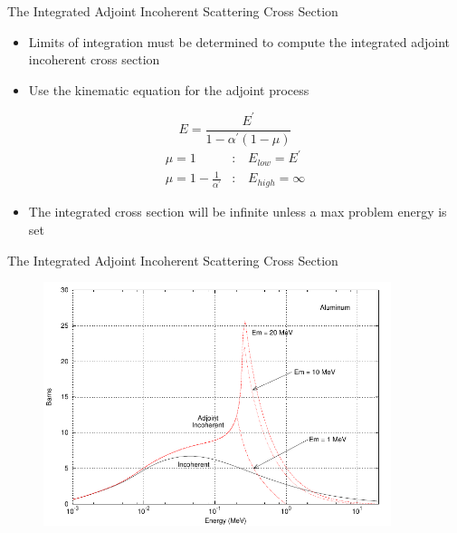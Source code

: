 \documentclass{beamer}
\begin{document}
\begin{frame}{The Integrated Adjoint Incoherent Scattering Cross Section}

  \begin{itemize}
    \item Limits of integration must be determined to compute the 
      integrated adjoint incoherent cross section
      \medskip
    \item Use the kinematic equation for the adjoint process
  \end{itemize}
  \begin{equation*}
    E = \frac{E^{'}}{1-\alpha^{'}(1-\mu)}
  \end{equation*}
  \begin{align}
    \mu = 1&\text{:} \quad E_{low} = E^{'} \nonumber \\
    \mu = 1 - \frac{1}{\alpha^{'}}&\text{:} \quad E_{high} = \infty \nonumber
  \end{align}
        
  \begin{itemize}
    \item The integrated cross section will be infinite unless a max problem 
      energy is set
  \end{itemize}
  
\end{frame}

\begin{frame}{The Integrated Adjoint Incoherent Scattering Cross Section}

  \begin{figure}[h!]
    \begin{center}
      \includegraphics[width=4.0in]{figures/adjoint_and_forward_incoherent_cross_section-13.pdf}
    \end{center}
  \end{figure}

\end{frame}
\end{document}
